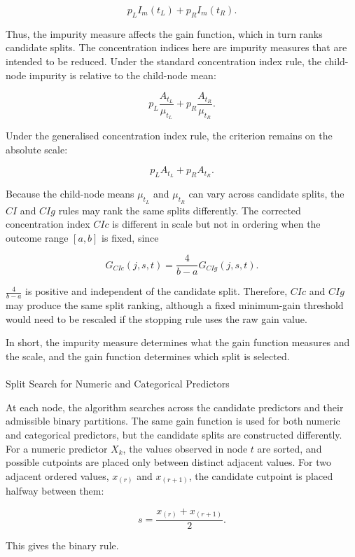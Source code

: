\documentclass[
  11pt,
  a4paper,
]{article}
\makeatletter
\let\oldparagraph\paragraph
\renewcommand{\paragraph}{
    \@ifstar
      \xxxParagraphStar
      \xxxParagraphNoStar
  }
\newcommand{\xxxParagraphStar}[1]{\oldparagraph*{#1}\mbox{}}
\newcommand{\xxxParagraphNoStar}[1]{\oldparagraph{#1}\mbox{}}
\makeatother
\begin{document}
\[
p_L I_m(t_L) + p_R I_m(t_R).
\]

Thus, the impurity measure affects the gain function, which in turn
ranks candidate splits. The concentration indices here are impurity
measures that are intended to be reduced. Under the standard
concentration index rule, the child-node impurity is relative to the
child-node mean:

\[
p_L \frac{A_{t_L}}{\mu_{t_L}}
+
p_R \frac{A_{t_R}}{\mu_{t_R}}.
\]

Under the generalised concentration index rule, the criterion remains on
the absolute scale:

\[
p_L A_{t_L} + p_R A_{t_R}.
\]

Because the child-node means \(\mu_{t_L}\) and \(\mu_{t_R}\) can vary
across candidate splits, the \(CI\) and \(CIg\) rules may rank the same
splits differently. The corrected concentration index \(CIc\) is
different in scale but not in ordering when the outcome range \([a,b]\)
is fixed, since

\[
G_{CIc}(j,s,t)
=
\frac{4}{b-a}G_{CIg}(j,s,t).
\]

\(\frac{4}{b-a}\) is positive and independent of the candidate split.
Therefore, \(CIc\) and \(CIg\) may produce the same split ranking,
although a fixed minimum-gain threshold would need to be rescaled if the
stopping rule uses the raw gain value.

In short, the impurity measure determines what the gain function
measures and the scale, and the gain function determines which split is
selected.

\paragraph{Split Search for Numeric and Categorical
Predictors}\label{sec-split-search}

At each node, the algorithm searches across the candidate predictors and
their admissible binary partitions. The same gain function is used for
both numeric and categorical predictors, but the candidate splits are
constructed differently. For a numeric predictor \(X_k\), the values
observed in node \(t\) are sorted, and possible cutpoints are placed
only between distinct adjacent values. For two adjacent ordered values,
\(x_{(r)}\) and \(x_{(r+1)}\), the candidate cutpoint is placed halfway
between them:

\[
s = \frac{x_{(r)} + x_{(r+1)}}{2}.
\]

This gives the binary rule.
\end{document}
